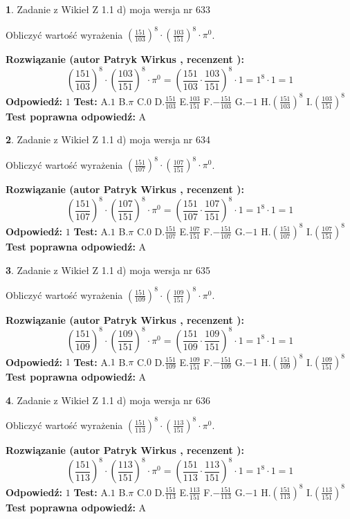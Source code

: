 \documentclass[12pt, a4paper]{article}
\theoremstyle{definition} %
\newtheorem{zad}{}
\newcommand{\zadStart}[1]{\begin{zad}#1\newline}
\newcommand{\zadStop}{\end{zad}}
\newcommand{\rozwStart}[2]{\noindent \textbf{Rozwiązanie (autor #1 , recenzent #2): }\newline}
\newcommand{\rozwStop}{\newline}
\newcommand{\odpStart}{\noindent \textbf{Odpowiedź:}\newline}
\newcommand{\odpStop}{\newline}
\newcommand{\testStart}{\noindent \textbf{Test:}\newline}
\newcommand{\testStop}{\newline}
\newcommand{\kluczStart}{\noindent \textbf{Test poprawna odpowiedź:}\newline}
\newcommand{\kluczStop}{\newline}
\begin{document}
\zadStart{Zadanie z Wikieł Z 1.1 d) moja wersja nr 633}

Obliczyć wartość wyrażenia $(\frac{151}{103})^{8} \cdot (\frac{103}{151})^{8} \cdot \pi^{0}$.
\zadStop
\rozwStart{Patryk Wirkus}{}
$$(\frac{151}{103})^{8} \cdot (\frac{103}{151})^{8} \cdot \pi^{0} = (\frac{151}{103} \cdot \frac{103}{151})^{8} \cdot 1 = 1^{8} \cdot 1 = 1$$
\rozwStop
\odpStart
$1$
\odpStop
\testStart
A.$1$ B.$\pi$ C.$0$ D.$\frac{151}{103}$ E.$\frac{103}{151}$
F.$-\frac{151}{103}$ G.$-1$
H.$(\frac{151}{103})^{8}$
I.$(\frac{103}{151})^{8}$
\testStop
\kluczStart
A
\kluczStop



\zadStart{Zadanie z Wikieł Z 1.1 d) moja wersja nr 634}

Obliczyć wartość wyrażenia $(\frac{151}{107})^{8} \cdot (\frac{107}{151})^{8} \cdot \pi^{0}$.
\zadStop
\rozwStart{Patryk Wirkus}{}
$$(\frac{151}{107})^{8} \cdot (\frac{107}{151})^{8} \cdot \pi^{0} = (\frac{151}{107} \cdot \frac{107}{151})^{8} \cdot 1 = 1^{8} \cdot 1 = 1$$
\rozwStop
\odpStart
$1$
\odpStop
\testStart
A.$1$ B.$\pi$ C.$0$ D.$\frac{151}{107}$ E.$\frac{107}{151}$
F.$-\frac{151}{107}$ G.$-1$
H.$(\frac{151}{107})^{8}$
I.$(\frac{107}{151})^{8}$
\testStop
\kluczStart
A
\kluczStop



\zadStart{Zadanie z Wikieł Z 1.1 d) moja wersja nr 635}

Obliczyć wartość wyrażenia $(\frac{151}{109})^{8} \cdot (\frac{109}{151})^{8} \cdot \pi^{0}$.
\zadStop
\rozwStart{Patryk Wirkus}{}
$$(\frac{151}{109})^{8} \cdot (\frac{109}{151})^{8} \cdot \pi^{0} = (\frac{151}{109} \cdot \frac{109}{151})^{8} \cdot 1 = 1^{8} \cdot 1 = 1$$
\rozwStop
\odpStart
$1$
\odpStop
\testStart
A.$1$ B.$\pi$ C.$0$ D.$\frac{151}{109}$ E.$\frac{109}{151}$
F.$-\frac{151}{109}$ G.$-1$
H.$(\frac{151}{109})^{8}$
I.$(\frac{109}{151})^{8}$
\testStop
\kluczStart
A
\kluczStop



\zadStart{Zadanie z Wikieł Z 1.1 d) moja wersja nr 636}

Obliczyć wartość wyrażenia $(\frac{151}{113})^{8} \cdot (\frac{113}{151})^{8} \cdot \pi^{0}$.
\zadStop
\rozwStart{Patryk Wirkus}{}
$$(\frac{151}{113})^{8} \cdot (\frac{113}{151})^{8} \cdot \pi^{0} = (\frac{151}{113} \cdot \frac{113}{151})^{8} \cdot 1 = 1^{8} \cdot 1 = 1$$
\rozwStop
\odpStart
$1$
\odpStop
\testStart
A.$1$ B.$\pi$ C.$0$ D.$\frac{151}{113}$ E.$\frac{113}{151}$
F.$-\frac{151}{113}$ G.$-1$
H.$(\frac{151}{113})^{8}$
I.$(\frac{113}{151})^{8}$
\testStop
\kluczStart
A
\kluczStop
\end{document}
